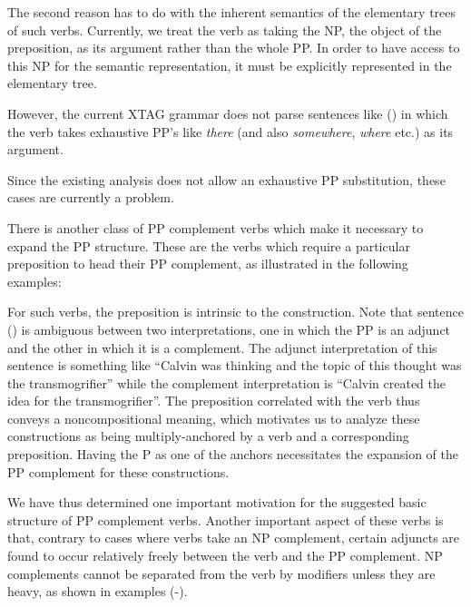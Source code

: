 
The second reason has to do with the inherent semantics of the elementary
trees of such verbs. Currently, we treat the verb as taking the NP, the
object of the preposition, as its argument rather than the whole PP. In
order to have access to this NP for the semantic representation, it must be
explicitly represented in the elementary tree.

However, the current XTAG grammar does not parse sentences like () in
which the verb takes exhaustive PP's like {\it there} (and also {\it
somewhere}, {\it where} etc.) as its argument. 


Since the existing analysis does not allow an exhaustive PP substitution,
these cases are currently a problem.

There is another class of PP complement verbs which make it necessary to
expand the PP structure. These are the verbs which require a particular
preposition to head their PP complement, as illustrated in the following
examples:


For such verbs, the preposition is intrinsic to the construction.  Note
that sentence () is ambiguous between two interpretations, one in
which the PP is an adjunct and the other in which it is a complement.  The
adjunct interpretation of this sentence is something like ``Calvin was
thinking and the topic of this thought was the transmogrifier'' while the
complement interpretation is ``Calvin created the idea for the
transmogrifier''.  The preposition correlated with the verb thus conveys a
noncompositional meaning, which motivates us to analyze these constructions
as being multiply-anchored by a verb and a corresponding preposition.
Having the P as one of the anchors necessitates the expansion of the PP
complement for these constructions.

We have thus determined one important motivation for the suggested basic
structure of PP complement verbs.  Another important aspect of these verbs
is that, contrary to cases where verbs take an NP complement, certain
adjuncts are found to occur relatively freely between the verb and the PP
complement. NP complements cannot be separated from the verb by modifiers
unless they are heavy, as shown in examples (-).

